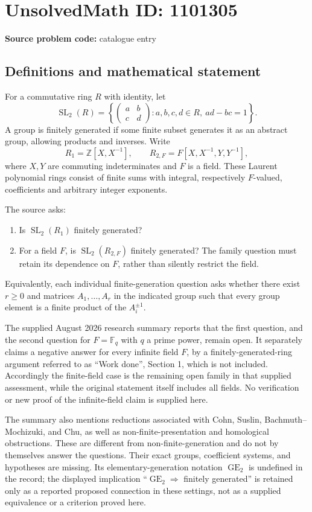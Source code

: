 \documentclass[11pt]{article}
\newcommand{\Z}{\mathbb{Z}}
\newcommand{\F}{\mathbb{F}}
\begin{document}
\section*{UnsolvedMath ID: 1101305}
\textbf{Source problem code:} catalogue entry
\subsection{Definitions and mathematical statement}
For a commutative ring $R$ with identity, let
\[
\operatorname{SL}_2(R)=\left\{\begin{pmatrix}a&b\\c&d\end{pmatrix}:a,b,c,d\in R,\ ad-bc=1\right\}.
\]
A group is finitely generated if some finite subset generates it as an abstract group, allowing products and inverses. Write
\[
R_1=\Z[X,X^{-1}],\qquad
R_{2,F}=F[X,X^{-1},Y,Y^{-1}],
\]
where $X,Y$ are commuting indeterminates and $F$ is a field. These Laurent polynomial rings consist of finite sums with integral, respectively $F$-valued, coefficients and arbitrary integer exponents.

The source asks:
\begin{enumerate}
\item Is $\operatorname{SL}_2(R_1)$ finitely generated?
\item For a field $F$, is $\operatorname{SL}_2(R_{2,F})$ finitely generated? The family question must retain its dependence on $F$, rather than silently restrict the field.
\end{enumerate}
Equivalently, each individual finite-generation question asks whether there exist $r\ge0$ and matrices $A_1,\ldots,A_r$ in the indicated group such that every group element is a finite product of the $A_i^{\pm1}$.

The supplied August 2026 research summary reports that the first question, and the second question for $F=\F_q$ with $q$ a prime power, remain open. It separately claims a negative answer for every infinite field $F$, by a finitely-generated-ring argument referred to as ``Work done'', Section 1, which is not included. Accordingly the finite-field case is the remaining open family in that supplied assessment, while the original statement itself includes all fields. No verification or new proof of the infinite-field claim is supplied here.

The summary also mentions reductions associated with Cohn, Suslin, Bachmuth--Mochizuki, and Chu, as well as non-finite-presentation and homological obstructions. These are different from non-finite-generation and do not by themselves answer the questions. Their exact groups, coefficient systems, and hypotheses are missing. Its elementary-generation notation $\operatorname{GE}_2$ is undefined in the record; the displayed implication ``$\operatorname{GE}_2\Rightarrow$ finitely generated'' is retained only as a reported proposed connection in these settings, not as a supplied equivalence or a criterion proved here.
\end{document}
